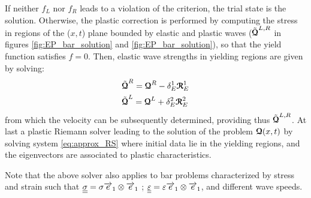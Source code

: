 If neither $f_L$ nor $f_R$ leads to a violation of the criterion, the trial state is the solution. Otherwise, the plastic correction is performed by computing the stress in regions of the ($x,t$) plane bounded by elastic and plastic waves ($\tilde{{\boldsymbol{\mathcal{Q}}}}^{L,R}$ in figures \ref{fig:EP_bar_solution} and \ref{fig:EP_bar_solution}), so that the yield function satisfies $f=0$. Then, elastic wave strengths in yielding regions are given by solving:
\begin{align}
  & \tilde{{\boldsymbol{\mathcal{Q}}}}^R = {\boldsymbol{\mathcal{Q}}}^R - \delta^1_E {\boldsymbol{\mathcal{R}}}^1_E\\
  & \tilde{{\boldsymbol{\mathcal{Q}}}}^L = {\boldsymbol{\mathcal{Q}}}^L + \delta^2_E {\boldsymbol{\mathcal{R}}}^2_E
\end{align}
from which the velocity can be subsequently determined, providing thus $\tilde{{\boldsymbol{\mathcal{Q}}}}^{L,R}$. At last a plastic Riemann solver leading to the solution of the problem ${\boldsymbol{\mathcal{Q}}}(x,t)$ by solving system \eqref{eq:approx_RS} where initial data lie in the yielding regions, and the eigenvectors are associated to plastic characteristics.

\begin{remark}
  Note that the above solver also applies to bar problems characterized by stress and strain such that ${\underline{\underline{\sigma}}}=\sigma {\overrightarrow{e}}_1\otimes {\overrightarrow{e}}_1$ ; ${\underline{\underline{\varepsilon}}}=\varepsilon {\overrightarrow{e}}_1\otimes {\overrightarrow{e}}_1$, and different wave speeds.
\end{remark}

